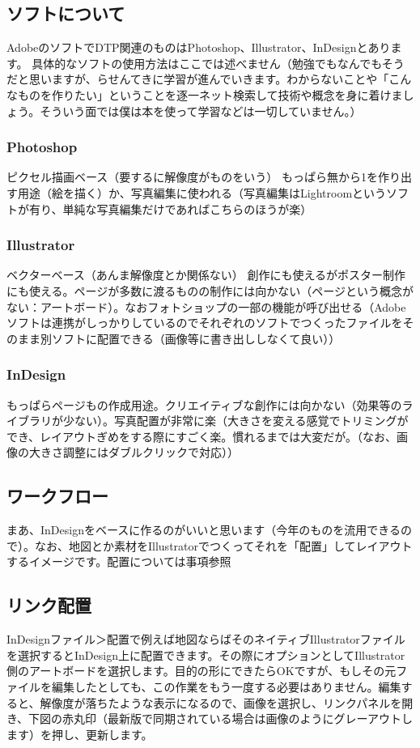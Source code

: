 \documentclass[dvipdfmx,jb5]{jarticle}
\begin{document}
\subsection{ソフトについて}
AdobeのソフトでDTP関連のものはPhotoshop、Illustrator、InDesignとあります。
具体的なソフトの使用方法はここでは述べません（勉強でもなんでもそうだと思いますが、らせんてきに学習が進んでいきます。わからないことや「こんなものを作りたい」ということを逐一ネット検索して技術や概念を身に着けましょう。そういう面では僕は本を使って学習などは一切していません。）

\subsubsection{Photoshop}
ピクセル描画ベース（要するに解像度がものをいう）
もっぱら無から1を作り出す用途（絵を描く）か、写真編集に使われる（写真編集はLightroomというソフトが有り、単純な写真編集だけであればこちらのほうが楽）
\subsubsection{Illustrator}
ベクターベース（あんま解像度とか関係ない）
創作にも使えるがポスター制作にも使える。ページが多数に渡るものの制作には向かない（ページという概念がない：アートボード）。なおフォトショップの一部の機能が呼び出せる（Adobeソフトは連携がしっかりしているのでそれぞれのソフトでつくったファイルをそのまま別ソフトに配置できる（画像等に書き出ししなくて良い））
\subsubsection{InDesign}
もっぱらページもの作成用途。クリエイティブな創作には向かない（効果等のライブラリが少ない）。写真配置が非常に楽（大きさを変える感覚でトリミングができ、レイアウトぎめをする際にすごく楽。慣れるまでは大変だが。（なお、画像の大きさ調整にはダブルクリックで対応））

\subsection{ワークフロー}
まあ、InDesignをベースに作るのがいいと思います（今年のものを流用できるので）。なお、地図とか素材をIllustratorでつくってそれを「配置」してレイアウトするイメージです。配置については事項参照

\subsection{リンク配置}
InDesignファイル＞配置で例えば地図ならばそのネイティブIllustratorファイルを選択するとInDesign上に配置できます。その際にオプションとしてIllustrator側のアートボードを選択します。目的の形にできたらOKですが、もしその元ファイルを編集したとしても、この作業をもう一度する必要はありません。編集すると、解像度が落ちたような表示になるので、画像を選択し、リンクパネルを開き、下図の赤丸印（最新版で同期されている場合は画像のようにグレーアウトします）を押し、更新します。
\end{document}
